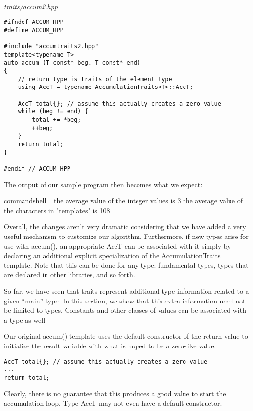 \hspace*{\fill} \\ %
\noindent
\textit{traits/accum2.hpp}
\begin{lstlisting}[style=styleCXX]
#ifndef ACCUM_HPP
#define ACCUM_HPP

#include "accumtraits2.hpp"
template<typename T>
auto accum (T const* beg, T const* end)
{
	// return type is traits of the element type
	using AccT = typename AccumulationTraits<T>::AccT;
	
	AccT total{}; // assume this actually creates a zero value
	while (beg != end) {
		total += *beg;
		++beg;
	}
	return total;
}

#endif // ACCUM_HPP
\end{lstlisting}

The output of our sample program then becomes what we expect:

\begin{tcblisting}{commandshell={}}
the average value of the integer values is 3
the average value of the characters in "templates" is 108
\end{tcblisting}

Overall, the changes aren’t very dramatic considering that we have added a very useful mechanism to customize our algorithm. Furthermore, if new types arise for use with accum(), an appropriate AccT can be associated with it simply by declaring an additional explicit specialization of the AccumulationTraits template. Note that this can be done for any type: fundamental types, types that are declared in other libraries, and so forth.


So far, we have seen that traits represent additional type information related to a given “main” type. In this section, we show that this extra information need not be limited to types. Constants and other classes of values can be associated with a type as well.

Our original accum() template uses the default constructor of the return value to initialize the result variable with what is hoped to be a zero-like value:

\begin{lstlisting}[style=styleCXX]
AccT total{}; // assume this actually creates a zero value
...
return total;
\end{lstlisting}

Clearly, there is no guarantee that this produces a good value to start the accumulation loop. Type AccT may not even have a default constructor.

